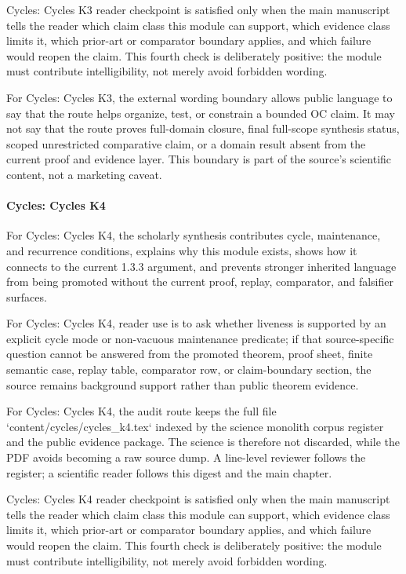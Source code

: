 Cycles: Cycles K3 reader checkpoint is satisfied only when the main manuscript tells the reader which claim class this module can support, which evidence class limits it, which prior-art or comparator boundary applies, and which failure would reopen the claim. This fourth check is deliberately positive: the module must contribute intelligibility, not merely avoid forbidden wording.


For Cycles: Cycles K3, the external wording boundary allows public language to say that the route helps organize, test, or constrain a bounded OC claim. It may not say that the route proves full-domain closure, final full-scope synthesis status, scoped unrestricted comparative claim, or a domain result absent from the current proof and evidence layer. This boundary is part of the source's scientific content, not a marketing caveat.


\paragraph{Cycles: Cycles K4}

For Cycles: Cycles K4, the scholarly synthesis contributes cycle, maintenance, and recurrence conditions, explains why this module exists, shows how it connects to the current 1.3.3 argument, and prevents stronger inherited language from being promoted without the current proof, replay, comparator, and falsifier surfaces.


For Cycles: Cycles K4, reader use is to ask whether liveness is supported by an explicit cycle mode or non-vacuous maintenance predicate; if that source-specific question cannot be answered from the promoted theorem, proof sheet, finite semantic case, replay table, comparator row, or claim-boundary section, the source remains background support rather than public theorem evidence.


For Cycles: Cycles K4, the audit route keeps the full file `content/cycles/cycles\_k4.tex` indexed by the science monolith corpus register and the public evidence package. The science is therefore not discarded, while the PDF avoids becoming a raw source dump. A line-level reviewer follows the register; a scientific reader follows this digest and the main chapter.


Cycles: Cycles K4 reader checkpoint is satisfied only when the main manuscript tells the reader which claim class this module can support, which evidence class limits it, which prior-art or comparator boundary applies, and which failure would reopen the claim. This fourth check is deliberately positive: the module must contribute intelligibility, not merely avoid forbidden wording.


